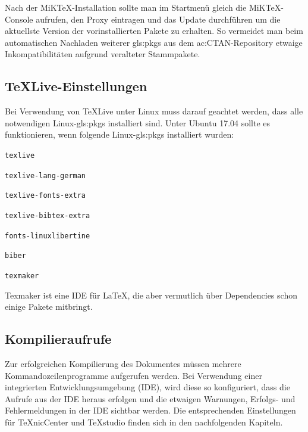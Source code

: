 Nach der MiKTeX-Installation sollte man im Startmenü gleich die MiKTeX-Console aufrufen, den Proxy eintragen und das Update durchführen um die aktuellste Version der vorinstallierten Pakete zu erhalten.
So vermeidet man beim automatischen Nachladen weiterer \glspl{gls:pkg} aus dem \acrshort{ac:CTAN}-Repository etwaige Inkompatibilitäten aufgrund veralteter Stammpakete.


\subsection{TeXLive-Einstellungen}
\label{sec:TeXLive}
Bei Verwendung von TeXLive unter Linux muss darauf geachtet werden, dass alle notwendigen Linux-\glspl{gls:pkg} installiert sind.
Unter Ubuntu 17.04 sollte es funktionieren, wenn folgende Linux-\glspl{gls:pkg} installiert wurden:
\begin{itemize*}
	\item {\small\verb#texlive#}
	\item {\small\verb#texlive-lang-german#}
	\item {\small\verb#texlive-fonts-extra#}
	\item {\small\verb#texlive-bibtex-extra#}
	\item {\small\verb#fonts-linuxlibertine#}
	\item {\small\verb#biber#}
	\item {\small\verb#texmaker#}
\end{itemize*}
Texmaker ist eine IDE für \LaTeX, die aber vermutlich über Dependencies schon einige Pakete mitbringt.


\subsection{Kompilieraufrufe}
\label{sec:Aufruf}
Zur erfolgreichen Kompilierung des Dokumentes müssen mehrere
Kommandozeilenprogramme aufgerufen werden.
Bei Verwendung einer integrierten Entwicklungsumgebung (IDE),
wird diese so konfiguriert, dass die Aufrufe aus der IDE heraus erfolgen und
die etwaigen Warnungen, Erfolgs- und Fehlermeldungen in der IDE sichtbar werden.
Die entsprechenden Einstellungen für TeXnicCenter und TeXstudio finden sich
in den nachfolgenden Kapiteln.

